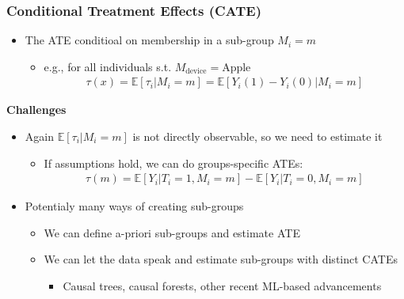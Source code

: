 \documentclass[10pt]{article}
\begin{document}
\subsubsection{Conditional Treatment Effects (CATE)}
\begin{itemize}
    \item The ATE conditioal on membership in a sub-group $M_i = m $
    \begin{itemize}
        \item e.g., for all individuals s.t. $M_{\text{device}} = \text{Apple} $
        \begin{gather*}
            \tau(x) = \mathbb{E}[\tau_i | M_i = m] = \mathbb{E}[Y_i(1) - Y_i(0) | M_i = m]
        \end{gather*}
    \end{itemize}
\end{itemize}
\textbf{Challenges}
\begin{itemize}
    \item Again $\mathbb{E}[\tau_i | M_i = m] $ is not directly observable, so we need to estimate it 
    \begin{itemize}
        \item If assumptions hold, we can do groups-specific ATEs: 
        \begin{gather*}
            \tau(m) = \mathbb{E}[Y_i | T_i = 1, M_i = m] - \mathbb{E}[Y_i | T_i = 0, M_i = m]
        \end{gather*}
    \end{itemize}
    \item Potentialy many ways of creating sub-groups
    \begin{itemize}
        \item We can define a-priori sub-groups and estimate ATE 
        \item We can let the data speak and estimate sub-groups with distinct CATEs
        \begin{itemize}
            \item Causal trees, causal forests, other recent ML-based advancements 
        \end{itemize}
    \end{itemize}
\end{itemize}
\newpage
\end{document}
